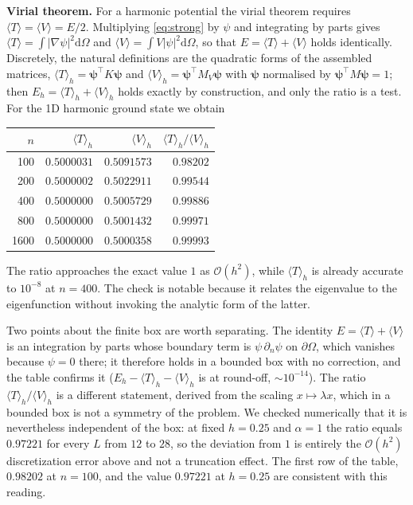 \documentclass[pdflatex,sn-mathphys-num]{sn-jnl}
\theoremstyle{thmstyleone}%
\theoremstyle{thmstyletwo}%
\theoremstyle{thmstylethree}%
\begin{document}
\textbf{Virial theorem.} For a harmonic potential the virial theorem
\cite{courant1953} requires
$\langle T\rangle = \langle V\rangle = E/2$. Multiplying \eqref{eq:strong} by
$\psi$ and integrating by parts gives
$\langle T\rangle = \int|\nabla\psi|^2\mathrm{d}\Omega$ and
$\langle V\rangle = \int V|\psi|^2\mathrm{d}\Omega$, so that
$E = \langle T\rangle + \langle V\rangle$ holds identically. Discretely, the
natural definitions are the quadratic forms of the assembled matrices,
$\langle T\rangle_h = \boldsymbol{\psi}^\top K\boldsymbol{\psi}$ and
$\langle V\rangle_h = \boldsymbol{\psi}^\top M_V\boldsymbol{\psi}$ with
$\boldsymbol{\psi}$ normalised by $\boldsymbol{\psi}^\top M\boldsymbol{\psi} = 1$;
then $E_h = \langle T\rangle_h + \langle V\rangle_h$ holds exactly by
construction, and only the ratio is a test. For the 1D harmonic ground state we
obtain
%
\begin{center}
\begin{tabular}{@{}rrrr@{}}
\toprule
$n$ & $\langle T\rangle_h$ & $\langle V\rangle_h$ & $\langle T\rangle_h/\langle V\rangle_h$ \\
\midrule
100  & $0.5000031$ & $0.5091573$ & $0.98202$ \\
200  & $0.5000002$ & $0.5022911$ & $0.99544$ \\
400  & $0.5000000$ & $0.5005729$ & $0.99886$ \\
800  & $0.5000000$ & $0.5001432$ & $0.99971$ \\
1600 & $0.5000000$ & $0.5000358$ & $0.99993$ \\
\bottomrule
\end{tabular}
\end{center}
%
The ratio approaches the exact value $1$ as $\mathcal{O}(h^2)$, while
$\langle T\rangle_h$ is already accurate to $10^{-8}$ at $n = 400$. The check is
notable because it relates the eigenvalue to the eigenfunction without invoking
the analytic form of the latter.

Two points about the finite box are worth separating. The identity
$E = \langle T\rangle + \langle V\rangle$ is an integration by parts whose
boundary term is $\psi\,\partial_n\psi$ on $\partial\Omega$, which vanishes
because $\psi = 0$ there; it therefore holds in a bounded box with no correction,
and the table confirms it ($E_h - \langle T\rangle_h - \langle V\rangle_h$ is at
round-off, $\sim10^{-14}$). The ratio $\langle T\rangle_h/\langle V\rangle_h$
is a different statement, derived from the scaling $x \mapsto \lambda x$, which
in a bounded box is not a symmetry of the problem. We checked numerically that
it is nevertheless independent of the box: at fixed $h = 0.25$ and $\alpha = 1$
the ratio equals $0.97221$ for every $L$ from $12$ to $28$, so the deviation
from $1$ is entirely the $\mathcal{O}(h^2)$ discretization error above and not a
truncation effect. The first row of the table, $0.98202$ at $n=100$, and the
value $0.97221$ at $h=0.25$ are consistent with this reading.
\end{document}
